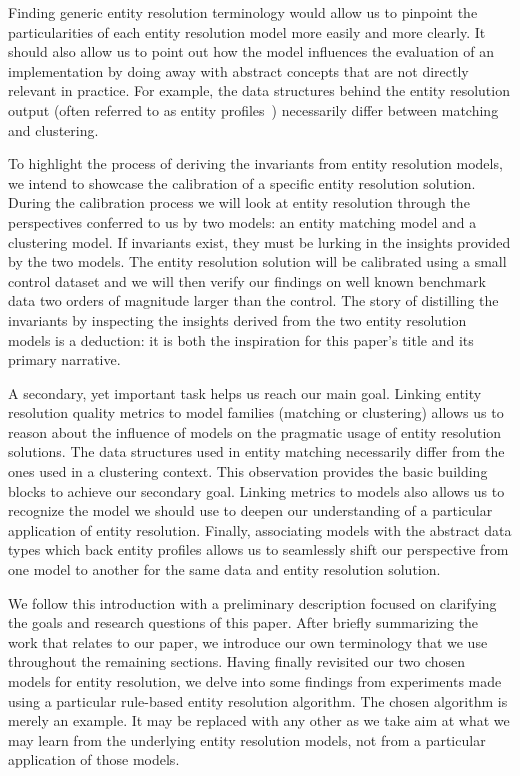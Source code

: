 \documentclass[journal]{IEEEtran}
\begin{document}
    Finding generic entity resolution terminology would allow us to pinpoint
    the particularities of each entity resolution model more easily and more
    clearly. 
    It should also allow us to point out how the model influences the evaluation
    of an implementation by doing away with abstract concepts that are not
    directly relevant in practice.
    For example, the data structures behind the entity resolution output (often
    referred to as entity profiles~\cite{jedai2017}) necessarily differ between
    matching and clustering.
    
    To highlight the process of deriving the invariants from entity resolution
    models, we intend to showcase the calibration of a specific entity
    resolution solution.
    During the calibration process we will look at entity resolution through
    the perspectives conferred to us by two models: an entity matching model and
    a clustering model.
    If invariants exist, they must be lurking in the insights provided by the
    two models.
    The entity resolution solution will be calibrated using a small control
    dataset and we will then verify our findings on well known benchmark data
    two orders of magnitude larger than the control.
    The story of distilling the invariants by inspecting the insights derived
    from the two entity resolution models is a deduction: it is both the
    inspiration for this paper's title and its primary narrative.
    
    A secondary, yet important task helps us reach our main goal.
    Linking entity resolution quality metrics to model families (matching or
    clustering) allows us to reason about the influence of models on the
    pragmatic usage of entity resolution solutions.
    The data structures used in entity matching necessarily differ from the ones
    used in a clustering context.
    This observation provides the basic building blocks to achieve our secondary
    goal.
    Linking metrics to models also allows us to recognize the model we should
    use to deepen our understanding of a particular application of entity
    resolution.
    Finally, associating models with the abstract data types which back entity
    profiles allows us to seamlessly shift our perspective from one model to
    another for the same data and entity resolution solution.
    
    We follow this introduction with a preliminary description focused on
    clarifying the goals and research questions of this paper.
    After briefly summarizing the work that relates to our paper, we introduce
    our own terminology that we use throughout the remaining sections.
    Having finally revisited our two chosen models for entity resolution, we
    delve into some findings from experiments made using a particular rule-based
    entity resolution algorithm.
    The chosen algorithm is merely an example. It may be replaced with any other
    as we take aim at what we may learn from the underlying entity resolution
    models, not from a particular application of those models.
\end{document}
